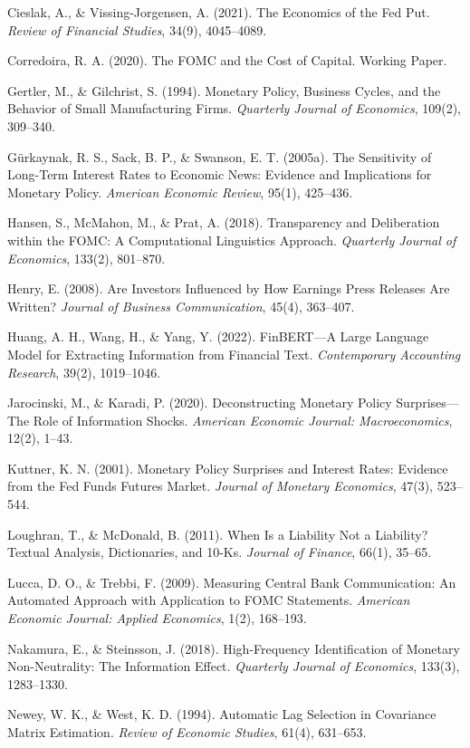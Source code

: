 \documentclass[12pt]{article}
\begin{document}
Cieslak, A., \& Vissing-Jorgensen, A. (2021). The Economics of the Fed Put. \textit{Review of Financial Studies}, 34(9), 4045--4089.

Corredoira, R. A. (2020). The FOMC and the Cost of Capital. Working Paper.

Gertler, M., \& Gilchrist, S. (1994). Monetary Policy, Business Cycles, and the Behavior of Small Manufacturing Firms. \textit{Quarterly Journal of Economics}, 109(2), 309--340.

G\"urkaynak, R. S., Sack, B. P., \& Swanson, E. T. (2005a). The Sensitivity of Long-Term Interest Rates to Economic News: Evidence and Implications for Monetary Policy. \textit{American Economic Review}, 95(1), 425--436.

Hansen, S., McMahon, M., \& Prat, A. (2018). Transparency and Deliberation within the FOMC: A Computational Linguistics Approach. \textit{Quarterly Journal of Economics}, 133(2), 801--870.

Henry, E. (2008). Are Investors Influenced by How Earnings Press Releases Are Written? \textit{Journal of Business Communication}, 45(4), 363--407.

Huang, A. H., Wang, H., \& Yang, Y. (2022). FinBERT---A Large Language Model for Extracting Information from Financial Text. \textit{Contemporary Accounting Research}, 39(2), 1019--1046.

Jarocinski, M., \& Karadi, P. (2020). Deconstructing Monetary Policy Surprises---The Role of Information Shocks. \textit{American Economic Journal: Macroeconomics}, 12(2), 1--43.

Kuttner, K. N. (2001). Monetary Policy Surprises and Interest Rates: Evidence from the Fed Funds Futures Market. \textit{Journal of Monetary Economics}, 47(3), 523--544.

Loughran, T., \& McDonald, B. (2011). When Is a Liability Not a Liability? Textual Analysis, Dictionaries, and 10-Ks. \textit{Journal of Finance}, 66(1), 35--65.

Lucca, D. O., \& Trebbi, F. (2009). Measuring Central Bank Communication: An Automated Approach with Application to FOMC Statements. \textit{American Economic Journal: Applied Economics}, 1(2), 168--193.

Nakamura, E., \& Steinsson, J. (2018). High-Frequency Identification of Monetary Non-Neutrality: The Information Effect. \textit{Quarterly Journal of Economics}, 133(3), 1283--1330.

Newey, W. K., \& West, K. D. (1994). Automatic Lag Selection in Covariance Matrix Estimation. \textit{Review of Economic Studies}, 61(4), 631--653.
\end{document}
